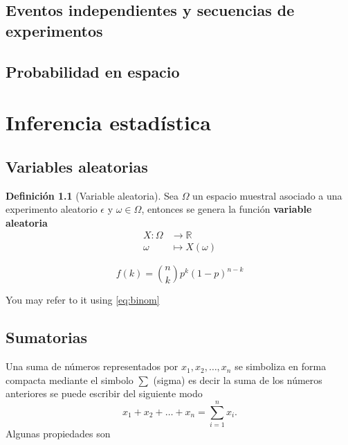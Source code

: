 \documentclass[
  11pt,
]{krantz}
\theoremstyle{definition}
\newtheorem{definition}{Definición}[chapter]
\theoremstyle{definition}
\theoremstyle{definition}
\theoremstyle{definition}
\theoremstyle{remark}
\begin{document}
\hypertarget{eventos-independientes-y-secuencias-de-experimentos}{%
\chapter{Eventos independientes y secuencias de experimentos}\label{eventos-independientes-y-secuencias-de-experimentos}}

\hypertarget{probabilidad-en-espacio}{%
\chapter{Probabilidad en espacio}\label{probabilidad-en-espacio}}

\hypertarget{part-inferencia-estaduxedstica}{%
\part{Inferencia estadística}\label{part-inferencia-estaduxedstica}}

\hypertarget{variables-aleatorias}{%
\chapter{Variables aleatorias}\label{variables-aleatorias}}

\begin{definition}[Variable aleatoria]
Sea \(\Omega\) un espacio muestral asociado a una experimento aleatorio \(\epsilon\) y \(\omega\in\Omega\), entonces se genera la función \textbf{variable aleatoria}
\begin{align*}
  X:\Omega&\longrightarrow \mathbb{R}\\
  \omega&\longmapsto X(\omega)
\end{align*}
\end{definition}

\begin{equation}
  f\left(k\right) = \binom{n}{k} p^k\left(1-p\right)^{n-k}
  \label{eq:binom}
\end{equation}

You may refer to it using \eqref{eq:binom}

\hypertarget{appendix-apendice}{%
\appendix {}}


\hypertarget{sumatorias}{%
\chapter{Sumatorias}\label{sumatorias}}

Una suma de números representados por \(x_1, x_2, \ldots, x_n\) se simboliza en forma compacta mediante el simbolo \(\sum\) (sigma) es decir la suma de los números anteriores se puede escribir del siguiente modo \[x_1+x_2+\dots+x_n=\sum_{i=1}^nx_i.\]
Algunas propiedades son
\end{document}
